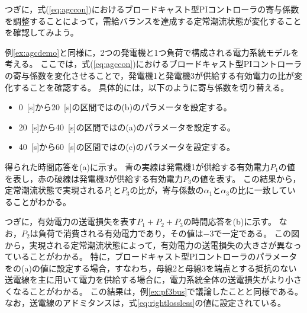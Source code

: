 \documentclass[tombow,dvipdfmx]{corona-a5-1.1}
\begin{document}
つぎに，式(\ref{eq:agccon})におけるブロードキャスト型PIコントローラの寄与係数を調整することによって，需給バランスを達成する定常潮流状態が変化することを確認してみよう。

\begin{例}[寄与係数の調整による定常潮流状態の変化]\label{ex:pfvary}
例\ref{ex:agcdemo}と同様に，2つの発電機と1つ負荷で構成される電力系統モデルを考える。
ここでは，式(\ref{eq:agccon})におけるブロードキャスト型PIコントローラの寄与係数を変化させることで，発電機1と発電機3が供給する有効電力の比が変化することを確認する。
具体的には，以下のように寄与係数を切り替える。
\begin{itemize}
\item 0~[s]から20~[s]の区間ではの(b)のパラメータを設定する。
\item 20~[s]から40~[s]の区間ではの(a)のパラメータを設定する。
\item 40~[s]から60~[s]の区間ではの(c)のパラメータを設定する。
\end{itemize}

得られた時間応答を(a)に示す。
青の実線は発電機1が供給する有効電力$P_1$の値を表し，赤の破線は発電機3が供給する有効電力$P_3$の値を表す。
この結果から，定常潮流状態で実現される$P_1$と$P_3$の比が，寄与係数の$\alpha_1$と$\alpha_3$の比に一致していることがわかる。

つぎに，有効電力の送電損失を表す$P_1+P_2+P_3$の時間応答を(b)に示す。
なお，$P_2$は負荷で消費される有効電力であり，その値は$-3$で一定である。
この図から，実現される定常潮流状態によって，有効電力の送電損失の大きさが異なっていることがわかる。
特に，ブロードキャスト型PIコントローラのパラメータをの(a)の値に設定する場合，すなわち，母線2と母線3を端点とする抵抗のない送電線を主に用いて電力を供給する場合に，電力系統全体の送電損失がより小さくなることがわかる。
この結果は，例\ref{ex:pf3bus}で議論したことと同様である。
なお，送電線のアドミタンスは，式\ref{eq:rightlossless}の値に設定されている。
\end{例}
\end{document}
